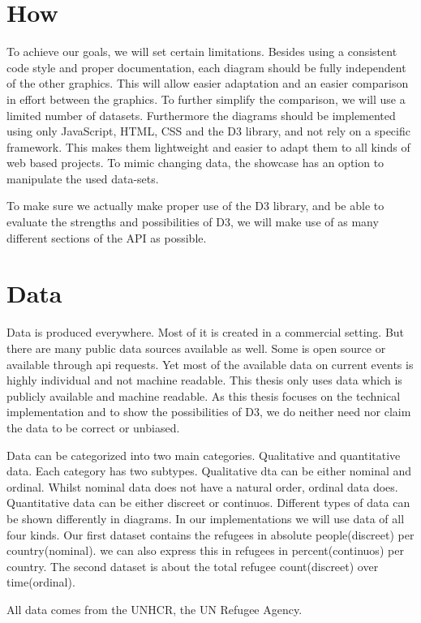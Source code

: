 \documentclass[
a4paper,     %
12pt         %
]{scrartcl}  %
\begin{document}
\section{How}
To achieve our goals, we will set certain limitations. Besides using a consistent code style and proper documentation, each diagram should be fully independent of the other graphics. This will allow easier adaptation and an easier comparison in effort between the graphics. To further simplify the comparison, we will use a limited number of datasets. Furthermore the diagrams should be implemented using only JavaScript, HTML, CSS and the D3 library, and not rely on a specific framework. This makes them lightweight and easier to adapt them to all kinds of web based projects. To mimic changing data, the showcase has an option to manipulate the used data-sets.

To make sure we actually make proper use of the D3 library, and be able to evaluate the strengths and possibilities of D3, we will make use of as many different sections of the API\cite{d3_api} as possible.

\section{Data}
Data is produced everywhere. Most of it is created in a commercial setting. But there are many public data sources available as well. Some is open source or available through api requests. Yet most of the available data on current events is highly individual and not machine readable. This thesis only uses data which is publicly available and machine readable. As this thesis focuses on the technical implementation and to show the possibilities of D3, we do neither need nor claim the data to be correct or unbiased.

Data can be categorized into two main categories. Qualitative and quantitative data. Each category has two subtypes. Qualitative dta can be either nominal and ordinal. Whilst nominal data does not have a natural order, ordinal data does. Quantitative data can be either discreet or continuos. Different types of data can be shown differently in diagrams. In our implementations we will use data of all four kinds. Our first dataset contains the refugees in absolute people(discreet) per country(nominal). we can also express this in refugees in percent(continuos) per country. The second dataset is about the total refugee count(discreet) over time(ordinal).

All data comes from the UNHCR, the UN Refugee Agency\cite{unhcr}.
\end{document}
